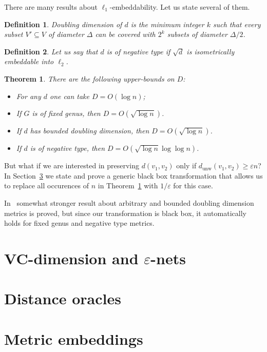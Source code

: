 \documentclass{article}
\newcommand{\dunw}{d_{\mathrm{unw}}}
\newcommand{\eps}{\varepsilon}
\newtheorem{definition}{Definition}
\newtheorem{theorem}{Theorem}
\begin{document}
    There are many results about $\ell_1$-embeddability. Let us state several of them.

    \begin{definition}
        Doubling dimension of $d$ is the minimum integer $k$ such that every subset $V' \subseteq V$ of diameter $\Delta$
        can be covered with $2^k$ subsets of diameter $\Delta / 2$.
    \end{definition}

    \begin{definition}
        Let us say that $d$ is of negative type if $\sqrt{d}$ is isometrically embeddable into $\ell_2$.
    \end{definition}

    \begin{theorem}
        \label{l1_embeddings}
        There are the following upper-bounds on $D$:
        \begin{itemize}
            \item \cite{B85} For any $d$ one can take $D = O(\log n)$;
            \item \cite{R99, IS07} If $G$ is of fixed genus, then $D = O(\sqrt{\log n})$. 
            \item \cite{GKL03} If $d$ has bounded doubling dimension, then $D = O(\sqrt{\log n})$.
            \item \cite{ALN05} If $d$ is of negative type, then $D = O(\sqrt{\log n} \log \log n)$. 
        \end{itemize}
    \end{theorem}

    But what if we are interested in preserving $d(v_1, v_2)$ only if $\dunw(v_1, v_2) \geq \eps n$?
    In Section~\ref{metric_embeddings} we state and prove a generic black box transformation
    that allows us to replace all occurences of $n$ in Theorem~\ref{l1_embeddings} with $1 / \eps$ for this case.

    In~\cite{ABCDGKNS05} somewhat stronger result about arbitrary and bounded doubling dimension metrics is proved, but since our transformation
    is black box, it automatically holds for fixed genus and negative type metrics.
    \section{VC-dimension and $\eps$-nets}

    \section{Distance oracles}
    \label{data_structure}

    \section{Metric embeddings}
    \label{metric_embeddings}

    
    
\end{document}
